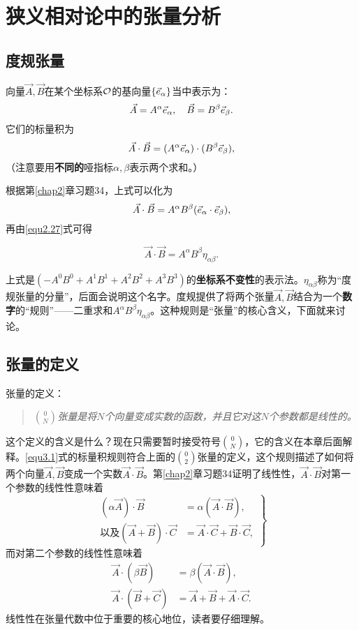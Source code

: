 \chapter{狭义相对论中的张量分析}
\label{chap3}

\section{度规张量}
\label{sec3.1}
向量$\vec{A}, \vec{B}$在某个坐标系$\mathcal{O}$的基向量$\{ \vec{e}_\alpha \}$当中表示为：
\[
    \vec{A} = A^\alpha \vec{e}_\alpha, \quad \vec{B} = B^\beta \vec{e}_\beta.
\]
它们的标量积为
\[
    \vec{A} \cdot \vec{B} = (A^\alpha \vec{e}_\alpha) \cdot (B^\beta \vec{e}_\beta),
\]
（注意要用\textbf{不同的}哑指标$\alpha, \beta$表示两个求和。）

根据第\ref{chap2}章习题34，上式可以化为
\[
    \vec{A} \cdot \vec{B} = A^\alpha B^\beta (\vec{e}_\alpha \cdot \vec{e}_\beta),
\]
再由\eqref{equ2.27}式可得
\begin{shaded}
\begin{equation}
    \vec{A} \cdot \vec{B} = A^\alpha B^\beta \eta_{\alpha \beta}.
\label{equ3.1}
\end{equation}
\end{shaded}
上式是$(-A^0 B^0 + A^1 B^1 + A^2 B^2 + A^3 B^3)$的\textbf{坐标系不变性}的表示法。$\eta_{\alpha \beta}$称为“度规张量的分量”，后面会说明这个名字。度规提供了将两个张量$\vec{A}, \vec{B}$结合为一个\textbf{数字}的“规则”——二重求和$A^\alpha B^\beta \eta_{\alpha \beta}$。这种规则是“张量”的核心含义，下面就来讨论。

\section{张量的定义}
\label{sec3.2}
张量的定义：
\begin{quote}
    \textit{$\binom{0}{N}$张量是将$N$个向量变成实数的函数，并且它对这$N$个参数都是线性的。}
\end{quote}
这个定义的含义是什么？现在只需要暂时接受符号$\binom{0}{N}$，它的含义在本章后面解释。\eqref{equ3.1}式的标量积规则符合上面的$\binom{0}{2}$张量的定义，这个规则描述了如何将两个向量$\vec{A}, \vec{B}$变成一个实数$\vec{A} \cdot \vec{B}$。第\ref{chap2}章习题34证明了线性性，$\vec{A} \cdot \vec{B}$对第一个参数的线性性意味着
\begin{equation}
\left.
\begin{split}
    (\alpha \vec{A}) \cdot \vec{B} &= \alpha (\vec{A} \cdot \vec{B}), \\
    \text{以及} (\vec{A} + \vec{B}) \cdot \vec{C} &= \vec{A} \cdot \vec{C} + \vec{B} \cdot \vec{C},
\end{split}
\right\}
\label{equ3.2}
\end{equation}
而对第二个参数的线性性意味着
\begin{align*}
    \vec{A} \cdot (\beta \vec{B}) &= \beta (\vec{A} \cdot \vec{B}), \\
    \vec{A} \cdot (\vec{B} + \vec{C}) &= \vec{A} + \vec{B} + \vec{A} \cdot \vec{C}.
\end{align*}
线性性在张量代数中位于重要的核心地位，读者要仔细理解。

